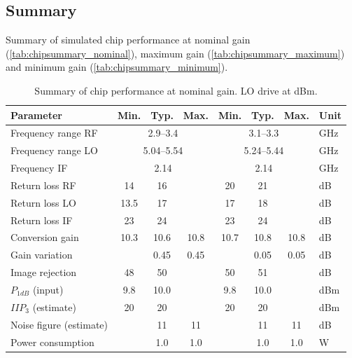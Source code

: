 		\subsection{Summary}
			Summary of simulated chip performance at nominal gain (\autoref{tab:chipsummary_nominal}), maximum gain (\autoref{tab:chipsummary_maximum}) and minimum gain (\autoref{tab:chipsummary_minimum}).

			\begin{table}[hbt!]
				\caption[Summarized chip performance at nominal gain.]{Summary of chip performance at nominal gain. LO drive at \unit[-2]{dBm}.\disclaimer}
				\label{tab:chipsummary_nominal}
				\centering
				\begin{tabular}{ l c c c c c c l } \toprule
					Parameter & Min. & Typ. & Max. & Min. & Typ. & Max. & Unit \\\midrule
					Frequency range RF & \multicolumn{3}{c}{2.9--3.4} & \multicolumn{3}{c}{3.1--3.3} & GHz \\
					Frequency range LO & \multicolumn{3}{c}{5.04--5.54} & \multicolumn{3}{c}{5.24--5.44} & GHz \\
					Frequency IF & \multicolumn{3}{c}{2.14} & \multicolumn{3}{c}{2.14} & GHz \\
					Return loss RF & 14 & 16 &  & 20 & 21 &  & dB \\
					Return loss LO & 13.5 & 17 &  & 17 & 18 &  & dB \\
					Return loss IF & 23 & 24 &  & 23 & 24 &  & dB \\
					Conversion gain & 10.3 & 10.6 & 10.8 & 10.7 & 10.8 & 10.8 & dB \\
					Gain variation & & 0.45 & 0.45 & & 0.05 & 0.05 & dB \\
					Image rejection & 48 & 50 &  & 50 & 51 &  &  dB \\
					$P_{1dB}$ (input) & 9.8 & 10.0 &  & 9.8 & 10.0 &  & dBm \\
					$IIP_3$ (estimate) & 20 & 20 &  & 20 & 20 &  & dBm \\
					Noise figure (estimate) &  & 11 & 11 &  & 11 & 11 & dB \\
					Power consumption &  & 1.0 & 1.0 &  & 1.0 & 1.0 & W \\\bottomrule
				\end{tabular}
			\end{table}

